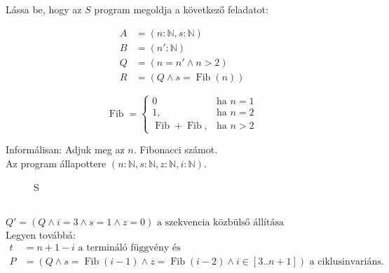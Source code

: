 \documentclass[a4paper,12pt]{article}
\begin{document}
	\newpage
	\setcounter{question}{1}
	\begin{question}
		Lássa be, hogy az $S$ program megoldja a következő feladatot: 
		\\[-18pt]
		
		\begin{minipage}{0.3\textwidth}
			\vspace*{0pt}
			\begin{align*}
				A &= ( n: \mathbb{N}, s: \mathbb{N} ) \\
				B &= ( n': \mathbb{N} ) \\
				Q &= ( n = n' \land n > 2) \\
				R &= (Q \land s = \mathop{Fib}(n))
			\end{align*}
		\end{minipage}
		\begin{minipage}{0.7\textwidth}
			\vspace*{0pt}
			\begin{equation*} \mathop{Fib(n)}=
				\begin{cases}
					0 &\text{ha }  n = 1 \\
					1, &\text{ha } n = 2 \\
					\mathop{Fib(n-1)} + \mathop{Fib(n-2)}, &\text{ha } n > 2
				\end{cases}
			\end{equation*}
		\end{minipage}

		\vspace{5pt}
		\noindent
		Informálisan: Adjuk meg az $n.$ Fibonacci számot. \\[4pt]
		\noindent
		Az program állapottere $ \left( n: \mathbb{N}, s: \mathbb{N}, z: \mathbb{N}, i: \mathbb{N} \right) $.
		
		\begin{wrapfigure}[2]{l}{5cm}
			\vspace{-2\baselineskip}
			\begin{stuki*}[5cm]{S}
				\begin{WHILE}{1}{}
				\end{WHILE}
			\end{stuki*}
		\end{wrapfigure}\leavevmode
		\noindent
		\\[18pt]
		$Q' = \left( Q \land i=3 \land s=1 \land z = 0 \right) \text{ a szekvencia közbülső állítása}$
		\\[34pt]\noindent
		Legyen továbbá: 
		\vspace{-9pt}
		\begin{align*}
			t &= n + 1 - i \text{ a termináló függvény és} \\
			P &= ( Q \land s = \mathop{Fib}(i-1) \land z = \mathop{Fib}(i-2) \land i \in [3..n+1]  ) \text{ a ciklusinvariáns.}
		\end{align*}
	\end{question}
\end{document}
